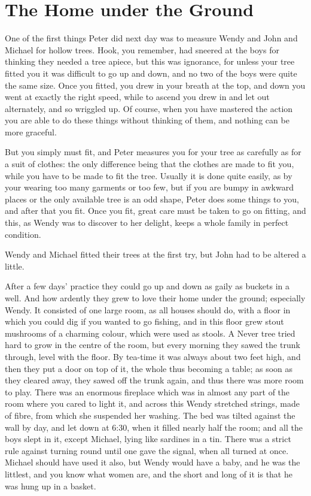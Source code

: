 
\chapter{The Home under the Ground}

One of the first things Peter did next day was to measure Wendy and John and Michael for hollow trees.
Hook, you remember, had sneered at the boys for thinking they needed a tree apiece,
but this was ignorance, for unless your tree fitted you it was difficult to go up and down,
and no two of the boys were quite the same size.
Once you fitted, you drew in your breath at the top, and down you went at exactly the right speed,
while to ascend you drew in and let out alternately, and so wriggled up.
Of course, when you have mastered the action you are able to do these things without thinking of them,
and nothing can be more graceful.

But you simply must fit, and Peter measures you for your tree as carefully as for a suit of clothes:
the only difference being that the clothes are made to fit you, while you have to be made to fit the tree.
Usually it is done quite easily, as by your wearing too many garments or too few,
but if you are bumpy in awkward places or the only available tree is an odd shape,
Peter does some things to you, and after that you fit.
Once you fit, great care must be taken to go on fitting,
and this, as Wendy was to discover to her delight, keeps a whole family in perfect condition.

Wendy and Michael fitted their trees at the first try, but John had to be altered a little.

After a few days' practice they could go up and down as gaily as buckets in a well.
And how ardently they grew to love their home under the ground;
especially Wendy.
It consisted of one large room, as all houses should do,
with a floor in which you could dig if you wanted to go fishing,
and in this floor grew stout mushrooms of a charming colour, which were used as stools.
A Never tree tried hard to grow in the centre of the room,
but every morning they sawed the trunk through, level with the floor.
By tea-time it was always about two feet high, and then they put a door on top of it,
the whole thus becoming a table;
as soon as they cleared away, they sawed off the trunk again, and thus there was more room to play.
There was an enormous fireplace which was in almost any part of the room where you cared to light it,
and across this Wendy stretched strings, made of fibre, from which she suspended her washing.
The bed was tilted against the wall by day, and let down at 6:30, when it filled nearly half the room;
and all the boys slept in it, except Michael, lying like sardines in a tin.
There was a strict rule against turning round until one gave the signal, when all turned at once.
Michael should have used it also, but Wendy would have a baby, and he was the littlest,
and you know what women are, and the short and long of it is that he was hung up in a basket.

